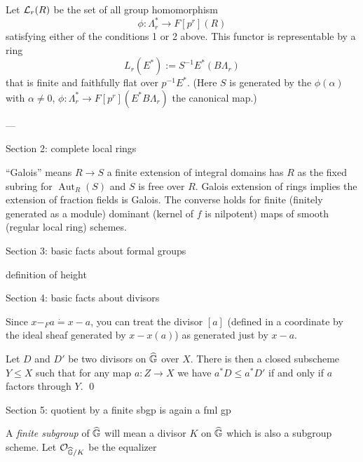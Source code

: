 \begin{lemma}
Let $\mathcal{L}_r(R)$ be the set of all group homomorphism \[\phi: \Lambda_r^* \to F[p^r](R)\] satisfying either of the conditions 1 or 2 above.  This functor is representable by a ring \[L_r(E^*) := S^{-1} E^*(B\Lambda_r)\] that is finite and faithfully flat over $p^{-1} E^*$.  (Here $S$ is generated by the $\phi(\alpha)$ with $\alpha \ne 0$, $\phi: \Lambda_r^* \to F[p^r](E^* B\Lambda_r)$ the canonical map.)
\end{lemma}

---

Section 2: complete local rings

``Galois'' means $R \to S$ a finite extension of integral domains has $R$ as the fixed subring for $\operatorname{Aut}_R(S)$ and $S$ is free over $R$.  Galois extension of rings implies the extension of fraction fields is Galois.  The converse holds for finite (finitely generated as a module) dominant (kernel of $f$ is nilpotent) maps of smooth (regular local ring) schemes.

Section 3: basic facts about formal groups

definition of height

Section 4: basic facts about divisors

Since $x -_F a \dot= x - a$, you can treat the divisor $[a]$ (defined in a coordinate by the ideal sheaf generated by $x - x(a)$) as generated just by $x - a$.

\begin{lemma}
Let $D$ and $D'$ be two divisors on $\widehat{\mathbb G}$ over $X$.  There is then a closed subscheme $Y \le X$ such that for any map $a: Z \to X$ we have $a^* D \le a^* D'$ if and only if $a$ factors through $Y$. \qed
\end{lemma}

Section 5: quotient by a finite sbgp is again a fml gp

\begin{definition}
A \textit{finite subgroup} of $\widehat{\mathbb G}$ will mean a divisor $K$ on $\widehat{\mathbb G}$ which is also a subgroup scheme.  Let $\mathcal{O}_{\widehat{\mathbb G}/K}$ be the equalizer
\begin{center}
\end{center}
\end{definition}

